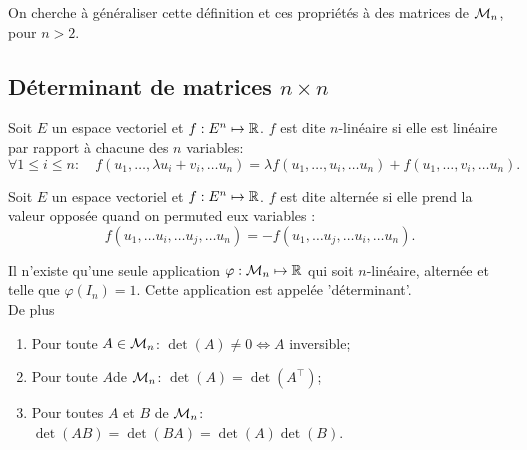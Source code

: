 \bigskip
On cherche à généraliser cette définition et ces propriétés à des matrices de $\mathcal{M}_n$, pour $n > 2$.

\subsection{Déterminant de matrices $n \times n$} 

\begin{definition} \label{def:applicationNLineaire}
  Soit $E$ un espace vectoriel et $f: E^n \mapsto \mathbb{R}$. $f$ est dite $n$-linéaire si elle est linéaire par rapport à chacune des $n$ variables:
  $$
  \forall 1 \leq i \leq n: \quad
  f(u_1, \dots, \lambda u_i + v_i, \dots u_n) = \lambda f(u_1, \dots, u_i, \dots u_n) + f(u_1, \dots, v_i, \dots u_n).
  $$
\end{definition}

\begin{definition} \label{def:applicationAlternee}
  Soit $E$ un espace vectoriel et $f: E^n \mapsto \mathbb{R}$. $f$ est dite alternée si elle prend la valeur opposée quand on permuted eux variables : 
  $$
  f(u_1, \dots u_i, \dots u_j, \dots u_n)
  =
  - f(u_1, \dots u_j, \dots u_i, \dots u_n).
  $$
\end{definition}

\begin{theorem} \label{thm:uniciteDeterminant}
  Il n'existe qu'une seule application $\varphi: \mathcal{M}_n \mapsto \mathbb{R}$ qui soit $n$-linéaire, alternée et telle que $\varphi(I_n) = 1$. Cette application est appelée 'déterminant'. \\
  De plus
  \begin{enumerate}[($a$)]
   \item Pour toute $A \in \mathcal{M}_n$: $\det(A) \neq 0 \Leftrightarrow A$ inversible;
   \item Pour toute $A$de $\mathcal{M}_n$: $\det(A) = \det(A^\top)$;
   \item Pour toutes $A$ et $B$ de $\mathcal{M}_n$: $\det(A B) = \det(B A) = \det(A) \det(B)$.
  \end{enumerate}
\end{theorem}


